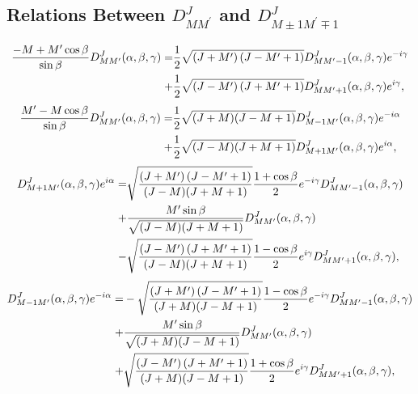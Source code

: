 \subsection{Relations Between $D_{M M^{\prime}}^{J}$ and $D_{M \pm 1 M^{\prime} \mp 1}^{J}$}\label{sec:4.8.3}
\begin{align}
 \frac{-M+M^{\prime} \cos \beta}{\sin \beta} D_{M M^{\prime}}^{J}(\alpha, \beta, \gamma)=& \frac{1}{2} \sqrt{\left(J+M^{\prime}\right)\left(J-M^{\prime}+1\right)} D_{M M^{\prime}-1}^{J}(\alpha, \beta, \gamma) e^{-i \gamma} \notag\\
+&\frac{1}{2} \sqrt{\left(J-M^{\prime}\right)\left(J+M^{\prime}+1\right)} D_{M M^{\prime}+1}^{J}(\alpha, \beta, \gamma) e^{i \gamma}, \label{eq:4:8:16}
\end{align}\begin{align}
 \frac{M^{\prime}-M \cos \beta}{\sin \beta} D_{M M^{\prime}}^{J}(\alpha, \beta, \gamma)=& \frac{1}{2} \sqrt{(J+M)(J-M+1)} D_{M-1 M^{\prime}}^{J}(\alpha, \beta, \gamma) e^{-i \alpha} \notag\\
+&\frac{1}{2} \sqrt{(J-M)(J+M+1)} D_{M+1 M^{\prime}}^{J}(\alpha, \beta, \gamma) e^{i \alpha},  \label{eq:4:8:17}
\end{align}\begin{align}
D_{M+1 M^{\prime}}^{J}(\alpha, \beta, \gamma) e^{i \alpha}= & \sqrt{\frac{\left(J+M^{\prime}\right)\left(J-M^{\prime}+1\right)}{(J-M)(J+M+1)}} \frac{1+\cos \beta}{2} e^{-i \gamma} D_{M M^{\prime}-1}^{J}(\alpha, \beta, \gamma)\notag \\
+ & \frac{M^{\prime} \sin \beta}{\sqrt{(J-M)(J+M+1)}} D_{M M^{\prime}}^{J}(\alpha, \beta, \gamma) \notag\\
- & \sqrt{\frac{\left(J-M^{\prime}\right)\left(J+M^{\prime}+1\right)}{(J-M)(J+M+1)}} \frac{1-\cos \beta}{2} e^{i \gamma} D_{M M^{\prime}+1}^{J}(\alpha, \beta, \gamma), \label{eq:4:8:18}
\end{align}\begin{align}
D_{M-1 M^{\prime}}^{J}(\alpha, \beta, \gamma) e^{-i \alpha}= & -\sqrt{\frac{\left(J+M^{\prime}\right)\left(J-M^{\prime}+1\right)}{(J+M)(J-M+1)}} \frac{1-\cos \beta}{2} e^{-i \gamma} D_{M M^{\prime}-1}^{J}(\alpha, \beta, \gamma) \notag\\
+ & \frac{M^{\prime} \sin \beta}{\sqrt{(J+M)(J-M+1)}} D_{M M^{\prime}}^{J}(\alpha, \beta, \gamma) \notag\\
+ & \sqrt{\frac{\left(J-M^{\prime}\right)\left(J+M^{\prime}+1\right)}{(J+M)(J-M+1)}} \frac{1+\cos \beta}{2} e^{i \gamma} D_{M M^{\prime}+1}^{J}(\alpha, \beta, \gamma) , \label{eq:4:8:19}

\end{align}
